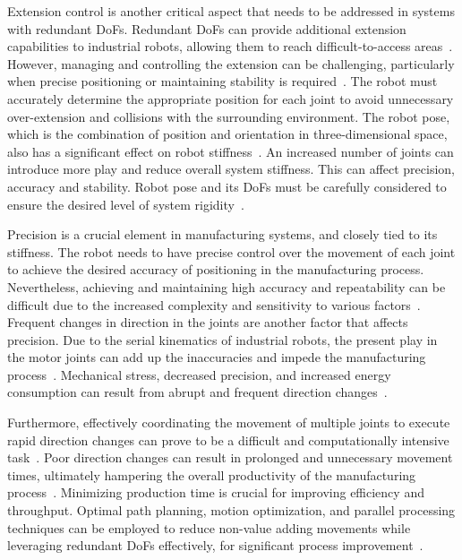 Extension control is another critical aspect that needs to be addressed in systems with redundant \acrshort{DoF}s. Redundant \acrshort{DoF}s can provide additional extension capabilities to industrial robots, allowing them to reach difficult-to-access areas~\cite{Duong.2021}. However, managing and controlling the extension can be challenging, particularly when precise positioning or maintaining stability is required~\cite{Lin.2022}.
The robot must accurately determine the appropriate position for each joint to avoid unnecessary over-extension and collisions with the surrounding environment. The robot pose, which is the combination of position and orientation in three-dimensional space, also has a significant effect on robot stiffness~\cite{Xiong.2019}. An increased number of joints can introduce more play and reduce overall system stiffness. This can affect precision, accuracy and stability. Robot pose and its \acrshort{DoF}s must be carefully considered to ensure the desired level of system rigidity~\cite{Wang.2022, Shi.2021}.


Precision is a crucial element in manufacturing systems, and closely tied to its stiffness. The robot needs to have precise control over the movement of each joint to achieve the desired accuracy of positioning in the manufacturing process. Nevertheless, achieving and maintaining high accuracy and repeatability can be difficult due to the increased complexity and sensitivity to various factors~\cite{Duong.2021}. %
Frequent changes in direction in the joints are another factor that affects precision. 
Due to the serial kinematics of industrial robots, the present play in the motor joints can add up the inaccuracies and impede the manufacturing process~\cite{Huynh.2020, ChenGang.2014}. Mechanical stress, decreased precision, and increased energy consumption can result from abrupt and frequent direction changes~\cite{Gasparetto.2010}.
 
Furthermore, effectively coordinating the movement of multiple joints to execute rapid direction changes can prove to be a difficult and computationally intensive task~\cite{VandeWeghe.2007}. Poor direction changes can result in prolonged and unnecessary movement times, ultimately hampering the overall productivity of the manufacturing process~\cite{Reiter.2016}. %
Minimizing production time is crucial for improving efficiency and throughput. Optimal path planning, motion optimization, and parallel processing techniques can be employed to reduce non-value adding movements while leveraging redundant \acrshort{DoF}s effectively, for significant process improvement~\cite{Boscariol.2020}.




